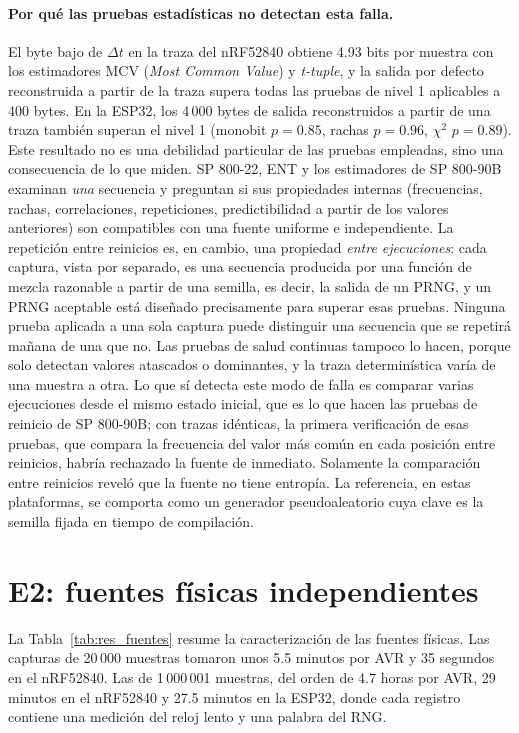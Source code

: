 \paragraph{Por qué las pruebas estadísticas no detectan esta falla.} El byte bajo de $\Delta t$ en la traza del nRF52840 obtiene 4.93 bits por muestra con los estimadores MCV (\textit{Most Common Value}) y \textit{t-tuple}, y la salida por defecto reconstruida a partir de la traza supera todas las pruebas de nivel 1 aplicables a 400 bytes. En la ESP32, los 4\,000 bytes de salida reconstruidos a partir de una traza también superan el nivel 1 (monobit $p = 0.85$, rachas $p = 0.96$, $\chi^2$ $p = 0.89$). Este resultado no es una debilidad particular de las pruebas empleadas, sino una consecuencia de lo que miden. SP 800-22, ENT y los estimadores de SP 800-90B examinan \emph{una} secuencia y preguntan si sus propiedades internas (frecuencias, rachas, correlaciones, repeticiones, predictibilidad a partir de los valores anteriores) son compatibles con una fuente uniforme e independiente. La repetición entre reinicios es, en cambio, una propiedad \emph{entre ejecuciones}: cada captura, vista por separado, es una secuencia producida por una función de mezcla razonable a partir de una semilla, es decir, la salida de un PRNG, y un PRNG aceptable está diseñado precisamente para superar esas pruebas. Ninguna prueba aplicada a una sola captura puede distinguir una secuencia que se repetirá mañana de una que no. Las pruebas de salud continuas tampoco lo hacen, porque solo detectan valores atascados o dominantes, y la traza determinística varía de una muestra a otra. Lo que sí detecta este modo de falla es comparar varias ejecuciones desde el mismo estado inicial, que es lo que hacen las pruebas de reinicio de SP 800-90B; con trazas idénticas, la primera verificación de esas pruebas, que compara la frecuencia del valor más común en cada posición entre reinicios, habría rechazado la fuente de inmediato. Solamente la comparación entre reinicios reveló que la fuente no tiene entropía. La referencia, en estas plataformas, se comporta como un generador pseudoaleatorio cuya clave es la semilla fijada en tiempo de compilación.

\section{E2: fuentes físicas independientes}
\label{sec:res_fuentes}

                La Tabla~\ref{tab:res_fuentes} resume la caracterización de las fuentes físicas. Las capturas de 20\,000 muestras tomaron unos 5.5 minutos por AVR y 35 segundos en el nRF52840. Las de 1\,000\,001 muestras, del orden de 4.7 horas por AVR, 29 minutos en el nRF52840 y 27.5 minutos en la ESP32, donde cada registro contiene una medición del reloj lento y una palabra del RNG.

